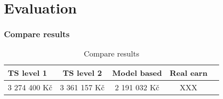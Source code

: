 
\chapter{Evaluation}
\label{evaluation}
\subsection{Compare results}
\begin{table}[h!]
    \begin{center}
        \begin{tabular}{ | l | c | c | c | c |}
            \hline
            {\textbf{TS level 1}} & \textbf{TS level 2} & \textbf{Model based} & \textbf{Real earn}\\
            \hline
            3 274 400 Kč & 3 361 157 Kč & 2 191 032 Kč & XXX \\
            \hline
        \end{tabular}
    \end{center}
    \caption{Compare results}
    \label{Compare results}
\end{table}
\newpage
